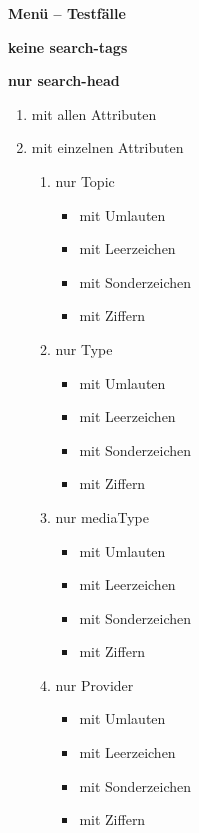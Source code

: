 \pagebreak

\centering \textbf{{\large Menü -- Testfälle}}



\flushleft \textbf{keine search-tags}


\flushleft \textbf{nur search-head}
\begin{enumerate}
   \item mit allen Attributen
   \item mit einzelnen Attributen  
   
   \begin{enumerate}  %
        \item nur Topic  
        \begin{itemize}
           \item mit Umlauten
           \item mit Leerzeichen
           \item mit Sonderzeichen
           \item mit Ziffern
        \end{itemize}
     
        \item nur Type
        \begin{itemize}
           \item mit Umlauten
           \item mit Leerzeichen
           \item mit Sonderzeichen
           \item mit Ziffern
        \end{itemize}
	
        \item nur mediaType
        \begin{itemize}
           \item mit Umlauten
           \item mit Leerzeichen
           \item mit Sonderzeichen
           \item mit Ziffern
        \end{itemize}
  
        \item nur Provider
        \begin{itemize}
           \item mit Umlauten
           \item mit Leerzeichen
           \item mit Sonderzeichen
           \item mit Ziffern
        \end{itemize}
  

\end{enumerate}
\end{enumerate}
